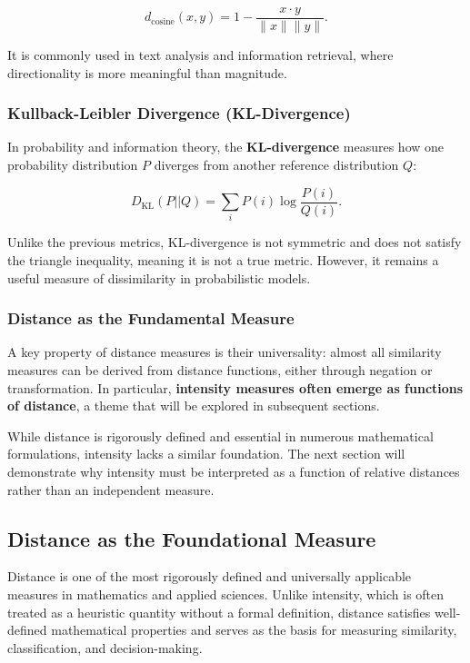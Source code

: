 \documentclass[12pt]{article}
\begin{document}
\[
d_{\text{cosine}}(x, y) = 1 - \frac{x \cdot y}{\|x\| \|y\|}.
\]

It is commonly used in text analysis and information retrieval, where directionality is more meaningful than magnitude.

\subsubsection{Kullback-Leibler Divergence (KL-Divergence)}
In probability and information theory, the \textbf{KL-divergence} measures how one probability distribution \( P \) diverges from another reference distribution \( Q \):

\[
D_{\text{KL}}(P || Q) = \sum_i P(i) \log \frac{P(i)}{Q(i)}.
\]

Unlike the previous metrics, KL-divergence is not symmetric and does not satisfy the triangle inequality, meaning it is not a true metric. However, it remains a useful measure of dissimilarity in probabilistic models.

\subsubsection{Distance as the Fundamental Measure}

A key property of distance measures is their universality: almost all similarity measures can be derived from distance functions, either through negation or transformation. In particular, \textbf{intensity measures often emerge as functions of distance}, a theme that will be explored in subsequent sections.

While distance is rigorously defined and essential in numerous mathematical formulations, intensity lacks a similar foundation. The next section will demonstrate why intensity must be interpreted as a function of relative distances rather than an independent measure.


\subsection{Distance as the Foundational Measure}

Distance is one of the most rigorously defined and universally applicable measures in mathematics and applied sciences. Unlike intensity, which is often treated as a heuristic quantity without a formal definition, distance satisfies well-defined mathematical properties and serves as the basis for measuring similarity, classification, and decision-making. 
\end{document}
